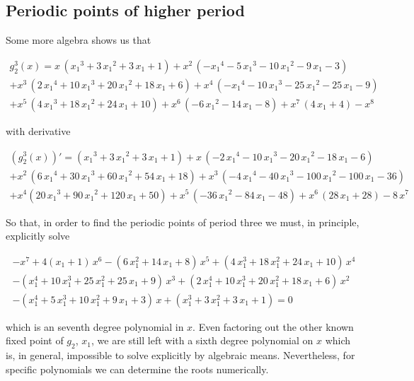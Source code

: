 \documentclass[10pt,twoside,titlepage]{book}
\numberwithin{equation}{chapter}
\numberwithin{figure}{chapter}
\numberwithin{table}{chapter}
\theoremstyle{plain}%
\theoremstyle{definition}
\theoremstyle{remark}
\begin{document}
\subsection{Periodic points of higher period}

Some more algebra shows us that

\begin{multline}
	\label{eq:g23}
	g_2^3(x)=x\,\left( {x_1}^{3}+3\,{x_1}^{2}+3\,x_1+1\right) +{x}^{2}\,\left( -{x_1}^{4}-5\,{x_1}^{3}-10\,{x_1}^{2}-9\,x_1-3\right)\\
	+{x}^{3}\,\left( 2\,{x_1}^{4}+10\,{x_1}^{3}+20\,{x_1}^{2}+18\,x_1+6\right) +{x}^{4}\,\left( -{x_1}^{4}-10\,{x_1}^{3}-25\,{x_1}^{2}-25\,x_1-9\right)\\
	+{x}^{5}\,\left( 4\,{x_1}^{3}+18\,{x_1}^{2}+24\,x_1+10\right) +{x}^{6}\,\left( -6\,{x_1}^{2}-14\,x_1-8\right) +{x}^{7}\,\left( 4\,x_1+4\right) -{x}^{8}
\end{multline}

with derivative

\begin{multline}
	\label{eq:d1g23}
	\left(g_2^3(x)\right)'=\left({x_1}^{3}+3\,{x_1}^{2}+3\,x_1+1\right)+x\,\left( -2\,{x_1}^{4}-10\,{x_1}^{3}-20\,{x_1}^{2}-18\,x_1-6\right)\\
	+{x}^{2}\,\left( 6\,{x_1}^{4}+30\,{x_1}^{3}+60\,{x_1}^{2}+54\,x_1+18\right)+{x}^{3}\, \left( -4\,{x_1}^{4}-40\,{x_1}^{3}-100\,{x_1}^{2}-100\,x_1-36\right)\\
	+{x}^{4}\left( 20\,{x_1}^{3}+90\,{x_1}^{2}+120\,x_1+50\right)+{x}^{5}\,\left(-36\,{x_1}^{2}-84\,x_1-48\right)+{x}^{6}\,\left( 28\,x_1+28\right)-8\,{x}^{7}
\end{multline}

So that, in order to find the periodic points of period three we must, in principle, explicitly solve

\begin{multline}
	-x^7+4(x_1 +1)\,x^6-(6\,x_1^2+14\,x_1+8) \,x^5+( 4\,x_1^3+18\,x_1^2+24\,x_1 +10) \,x^4 \\
	-(x_1^4+10\,x_1^3+25\,x_1^2+25\,x_1 +9) \,x^3+( 2\,x_1^4+10\,x_1^3+20\,x_1^2+18\,x_1 +6) \,x^2\\
	-(x_1^4+5\,x_1^3+10\,x_1^2+9\,x_1 +3) \,x+( x_1^3+3\,x_1^2+3\,x_1 +1)=0
\end{multline}

which is an seventh degree polynomial in $x$. Even factoring out the other known fixed point of $g_2$, $x_1$, we are still left with a sixth degree polynomial on $x$ which is, in general, impossible to solve explicitly by algebraic means. Nevertheless, for specific polynomials we can determine the roots numerically.
\end{document}
